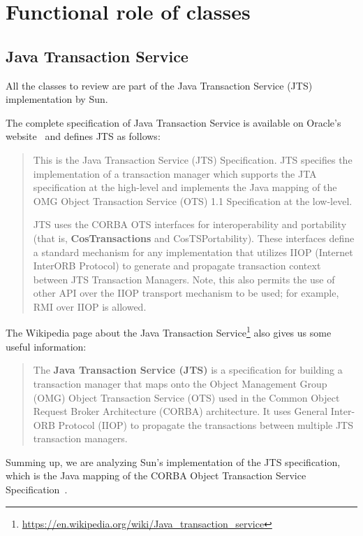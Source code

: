 \section{Functional role of classes}
\label{sec:functional-role}

\subsection{Java Transaction Service}
All the classes to review are part of the Java Transaction Service (JTS) implementation by Sun.

The complete specification of Java Transaction Service is available on Oracle's website~\cite{jts-specification} and defines JTS as follows:
\begin{quotation}
This is the Java Transaction Service (JTS) Specification.
JTS specifies the
implementation of a transaction manager which supports the JTA specification at
the high-level and implements the Java mapping of the OMG Object Transaction
Service (OTS) 1.1 Specification at the low-level.

JTS uses the CORBA OTS interfaces for interoperability and portability (that is, \textbf{CosTransactions} and CosTSPortability).
These interfaces define a standard mechanism for any implementation that utilizes IIOP (Internet InterORB Protocol) to generate and
propagate transaction context between JTS Transaction Managers. Note, this also
permits the use of other API over the IIOP transport mechanism to be used; for
example, RMI over IIOP is allowed.
\end{quotation}

The Wikipedia page about the Java Transaction Service\footnote{\url{https://en.wikipedia.org/wiki/Java_transaction_service}} also gives us some useful information:
\begin{quote}
The \textbf{Java Transaction Service (JTS)} is a specification for building a transaction manager that maps onto the Object Management Group (OMG) Object Transaction Service (OTS) used in the Common Object Request Broker Architecture (CORBA) architecture. It uses General Inter-ORB Protocol (IIOP) to propagate the transactions between multiple JTS transaction managers.
\end{quote}

Summing up, we are analyzing Sun's implementation of the JTS specification, which is the Java mapping of the CORBA Object Transaction Service Specification~\cite{omg-ots}.

